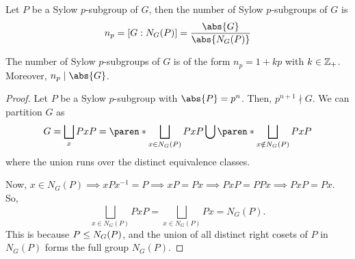 \documentclass[11pt]{penrose}
\begin{document}
\begin{nlemma}
    Let $P$ be a Sylow $p$-subgroup of $G$, then the number of Sylow $p$-subgroups of $G$ is
    \begin{equation*}
        n_{p} = [G : N_{G}(P)] = \frac{ \abs{G} }{ \abs{N_{G}(P)} }
    \end{equation*}
\end{nlemma}

\begin{nthm}
    The number of Sylow $p$-subgroups of $G$ is of the form $n_{p} = 1 + kp$ with $k \in \mathbb{Z}_{+}$. Moreover, $n_{p} \mid \abs{G}$.
\end{nthm}
\begin{proof}
    Let $P$ be a Sylow $p$-subgroup with $\abs{P} = p^{n}$. Then, $p^{n+1} \nmid G$. We can partition $G$ as
    \begin{equation*}
        G
        = \bigsqcup_{x} PxP
        = \paren*{\bigsqcup_{x \in N_{G}(P)} PxP} \bigcup \paren*{\bigsqcup_{x \notin N_{G}(P)} PxP}
    \end{equation*}
    where the union runs over the distinct equivalence classes.

    Now, $x \in N_{G}(P) \implies xPx^{-1} = P \implies xP = Px \implies PxP = PPx \implies PxP = Px$. So,
    \begin{equation*}
        \bigsqcup_{x \in N_{G}(P)} PxP
        = \bigsqcup_{x \in N_{G}(P)} Px
        = N_{G}(P).
    \end{equation*}
    This is because $P \mathrel{\leq} N_{G}(P)$, and the union of all distinct right cosets of $P$ in $N_{G}(P)$ forms the full group $N_{G}(P)$.


\end{proof}
\end{document}
